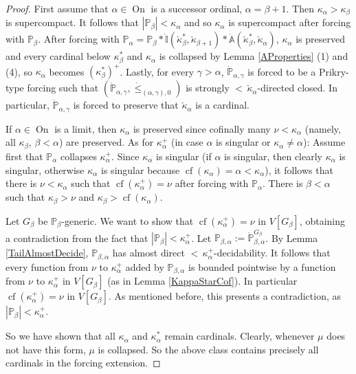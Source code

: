 \documentclass[a4paper]{amsart}
\theoremstyle{definition}
\theoremstyle{remark}
\theoremstyle{plain}
\numberwithin{mydef}{section}
\DeclareMathOperator{\cf}{cf}
\DeclareMathOperator{\On}{On}
\newcommand{\dA}{\mathbb{A}}
\newcommand{\dI}{\mathbb{I}}
\newcommand{\dP}{\mathbb{P}}
\begin{document}
	\begin{proof}
		First assume that $\alpha\in\On$ is a successor ordinal, $\alpha=\beta+1$. Then $\kappa_{\alpha}>\kappa_{\beta}$ is supercompact. It follows that $|\dP_{\beta}|<\kappa_{\alpha}$ and so $\kappa_{\alpha}$ is supercompact after forcing with $\dP_{\beta}$. After forcing with $\dP_{\alpha}=\dP_{\beta}*\dot{\dI}(\check{\kappa}_{\beta}^*,\check{\kappa}_{\beta+1})*\dot{\dA}(\check{\kappa}_{\beta}^*,\check{\kappa}_{\alpha})$, $\kappa_{\alpha}$ is preserved and every cardinal below $\kappa_{\beta}^*$ and $\kappa_{\alpha}$ is collapsed by Lemma \ref{AProperties} (1) and (4), so $\kappa_{\alpha}$ becomes $(\kappa_{\beta}^*)^+$. Lastly, for every $\gamma>\alpha$, $\dot{\dP}_{\alpha,\gamma}$ is forced to be a Prikry-type forcing such that $(\dot{\dP}_{\alpha,\gamma},\dot{\leq}_{(\alpha,\gamma),0})$ is strongly ${<}\,\check{\kappa}_{\alpha}$-directed closed. In particular, $\dot{\dP}_{\alpha,\gamma}$ is forced to preserve that $\check{\kappa}_{\alpha}$ is a cardinal.
		
		If $\alpha\in\On$ is a limit, then $\kappa_{\alpha}$ is preserved since cofinally many $\nu<\kappa_{\alpha}$ (namely, all $\kappa_{\beta}$, $\beta<\alpha$) are preserved. As for $\kappa_{\alpha}^+$ (in case $\alpha$ is singular or $\kappa_{\alpha}\neq\alpha$): Assume first that $\dP_{\alpha}$ collapses $\kappa_{\alpha}^+$. Since $\kappa_{\alpha}$ is singular (if $\alpha$ is singular, then clearly $\kappa_{\alpha}$ is singular, otherwise $\kappa_{\alpha}$ is singular because $\cf(\kappa_{\alpha})=\alpha<\kappa_{\alpha}$), it follows that there is $\nu<\kappa_{\alpha}$ such that $\cf(\kappa_{\alpha}^+)=\nu$ after forcing with $\dP_{\alpha}$. There is $\beta<\alpha$ such that $\kappa_{\beta}>\nu$ and $\kappa_{\beta}>\cf(\kappa_{\alpha})$.
		
		Let $G_{\beta}$ be $\dP_{\beta}$-generic. We want to show that $\cf(\kappa_{\alpha}^+)=\nu$ in $V[G_{\beta}]$, obtaining a contradiction from the fact that $|\dP_{\beta}|<\kappa_{\alpha}^+$. Let $\dP_{\beta,\alpha}:=\dot{\dP}_{\beta,\alpha}^{G_{\beta}}$. By Lemma \ref{TailAlmostDecide}, $\dP_{\beta,\alpha}$ has almost direct ${<}\,\kappa_{\alpha}^+$-decidability. It follows that every function from $\nu$ to $\kappa_{\alpha}^+$ added by $\dP_{\beta,\alpha}$ is bounded pointwise by a function from $\nu$ to $\kappa_{\alpha}^+$ in $V[G_{\beta}]$ (as in Lemma \ref{KappaStarCof}). In particular $\cf(\kappa_{\alpha}^+)=\nu$ in $V[G_{\beta}]$. As mentioned before, this presents a contradiction, as $|\dP_{\beta}|<\kappa_{\alpha}^+$.
		
		So we have shown that all $\kappa_{\alpha}$ and $\kappa_{\alpha}^*$ remain cardinals. Clearly, whenever $\mu$ does not have this form, $\mu$ is collapsed. So the above class contains precisely all cardinals in the forcing extension.
	\end{proof}
	
\end{document}
